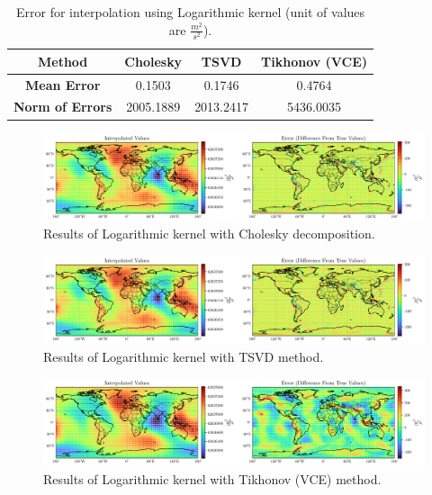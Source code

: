 \documentclass[12pt]{article}
\begin{document}
	\begin{table}[h!]
		\centering
		\caption{Error for interpolation using Logarithmic kernel (unit of values are $\frac{m^2}{s^2}$).}
		\vspace{0.3cm}
		\renewcommand{\arraystretch}{1.4}
		\begin{tabular}{c|c|c|c}
			\textbf{Method} & Cholesky & TSVD & Tikhonov (VCE) \\
			\hline 
			\textbf{Mean Error} & 0.1503 & 0.1746 & 0.4764 \\
			\hline 
			\textbf{Norm of Errors} & 2005.1889 & 2013.2417 & 5436.0035 \\
		\end{tabular}
		\label{tab:Logarithmic_Error}
	\end{table}
	
	\begin{figure}[h!]
		\centering
		\includegraphics[width=16cm]{../Outputs/Logarithmic_Cholesky.pdf}
		\caption{Results of Logarithmic kernel with Cholesky decomposition.}
		\label{fig:Logarithmic_Chol}
	\end{figure}
	
	\begin{figure}[h!]
		\centering
		\includegraphics[width=16cm]{../Outputs/Logarithmic_TSVD.pdf}
		\caption{Results of Logarithmic kernel with TSVD method.}
		\label{fig:Logarithmic_TSVD}
	\end{figure}
	
	\begin{figure}[h!]
		\centering
		\includegraphics[width=16cm]{../Outputs/Logarithmic_VCE.pdf}
		\caption{Results of Logarithmic kernel with Tikhonov (VCE) method.}
		\label{fig:Logarithmic_VCE}
	\end{figure}
\end{document}
